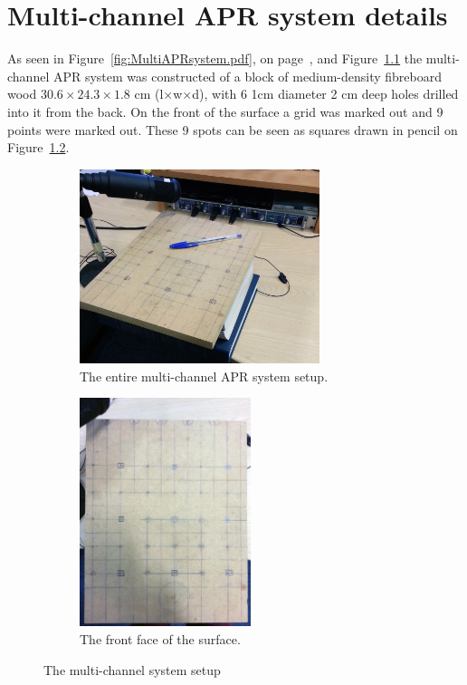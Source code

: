 \chapter{Multi-channel APR system details}\label{ap:MultiAPRsystem}

\ifpdf
    \graphicspath{{Appendices/AppendixMultiAPRsystem/Photos/}{Appendices/AppendixMultiAPRsystem/Figs/}}
\else
\fi

As seen in Figure~\ref{fig:MultiAPRsystem.pdf}, on page~\pageref{fig:MultiAPRsystem.pdf}, and Figure~\ref{fig:wholesystem} the multi-channel APR system was constructed of a block of medium-density fibreboard wood $30.6 \times 24.3 \times 1.8$ cm (l$\times$w$\times$d), with 6 1cm diameter 2 cm deep holes drilled into it from the back. On the front of the surface a grid was marked out and 9 points were marked out. These 9 spots can be seen as squares drawn in pencil on Figure~\ref{fig:frontfacesurface}.
\begin{figure}[b!]
\centering
\begin{subfigure}{.5\textwidth}
  \centering
  \includegraphics[width=7cm]{wholesystem}
  \caption{The entire multi-channel APR system setup.}
  \label{fig:wholesystem}
\end{subfigure}%
\begin{subfigure}{.5\textwidth}
  \centering
  \includegraphics[width=5cm]{surface}
  \caption{The front face of the surface.}
  \label{fig:frontfacesurface}
\end{subfigure}
\caption{The multi-channel system setup}
\label{fig:multiAPRsystemwhole}
\end{figure}

